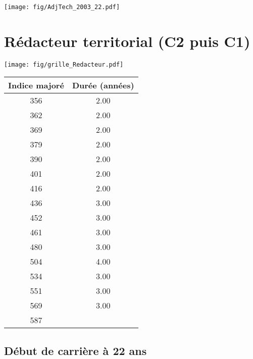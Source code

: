  \vspace{0.1cm} 

 \begin{center}\texttt{[image: fig/AdjTech\_2003\_22.pdf]}\end{center} \label{fig/AdjTech_2003_22.pdf} 

\newpage 
 
\chapter{Rédacteur territorial (C2 puis C1)} 

\begin{minipage}{0.55\linewidth}\texttt{[image: fig/grille\_Redacteur.pdf]}\end{minipage} 
\begin{minipage}{0.3\linewidth} 
 \begin{center} 

\begin{tabular}[htb]{|c|c|} 
\hline 
 Indice majoré &  Durée (années) \\ 
\hline \hline 
 356 &  2.00 \\ 
\hline 
 362 &  2.00 \\ 
\hline 
 369 &  2.00 \\ 
\hline 
 379 &  2.00 \\ 
\hline 
 390 &  2.00 \\ 
\hline 
 401 &  2.00 \\ 
\hline 
 416 &  2.00 \\ 
\hline 
 436 &  3.00 \\ 
\hline 
 452 &  3.00 \\ 
\hline 
 461 &  3.00 \\ 
\hline 
 480 &  3.00 \\ 
\hline 
 504 &  4.00 \\ 
\hline 
 534 &  3.00 \\ 
\hline 
 551 &  3.00 \\ 
\hline 
 569 &  3.00 \\ 
\hline 
 587 &   \\ 
\hline 
\hline 
\end{tabular} 
\end{center} 
 \end{minipage} 


 \addto{\captionsenglish}{ \renewcommand{\mtctitle}{}} \setcounter{minitocdepth}{2} 
 \minitoc \newpage 

\section{Début de carrière à 22 ans} 


